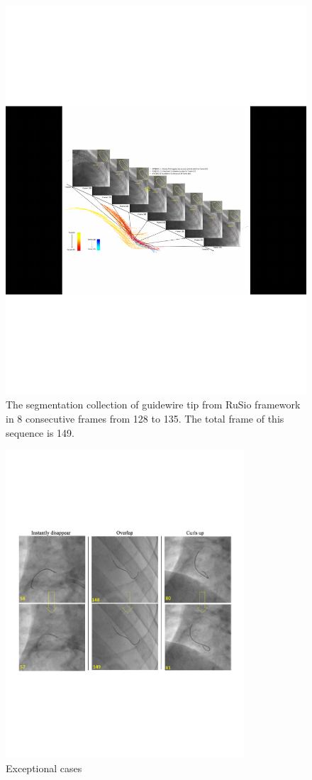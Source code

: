 \documentclass[journal]{IEEEtran}
\begin{document}
\begin{figure}[!htb]
	\centering  
	\includegraphics[width=7.1in]{figures/figure7}
		\caption{The segmentation collection of guidewire tip from RuSio framework in 8 consecutive frames from 128 to 135. The total frame of this sequence is 149.}  
	\label{fig:mcmthesis-logo} 
\end{figure}

\begin{figure}[!htb]
	\centering  
	\includegraphics[width=3.5in]{figures/figure9}
		\caption{Exceptional cases} 
	\label{fig:mcmthesis-logo} 
\end{figure}
\end{document}
